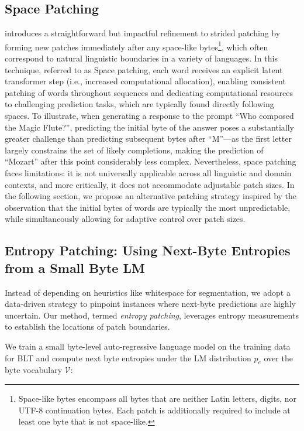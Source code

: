 \subsection{Space Patching}
\label{section:white-patch}

\citet{slagle2024spacebyte} introduces a straightforward but impactful refinement to strided patching by forming new patches immediately after any space-like bytes\footnote{
    Space-like bytes encompass all bytes that are neither Latin letters, digits, nor UTF-8 continuation bytes. Each patch is additionally required to include at least one byte that is not space-like. }, which often correspond to natural linguistic boundaries in a variety of languages. In this technique, referred to as Space patching, each word receives an explicit latent transformer step (i.e., increased computational allocation), enabling consistent patching of words throughout sequences and dedicating computational resources to challenging prediction tasks, which are typically found directly following spaces. To illustrate, when generating a response to the prompt ``Who composed the Magic Flute?\uline{\hspace{.6em}}'', predicting the initial byte of the answer poses a substantially greater challenge than predicting subsequent bytes after ``M''—as the first letter largely constrains the set of likely completions, making the prediction of ``Mozart'' after this point considerably less complex. Nevertheless, space patching faces limitations: it is not universally applicable across all linguistic and domain contexts, and more critically, it does not accommodate adjustable patch sizes. In the following section, we propose an alternative patching strategy inspired by the observation that the initial bytes of words are typically the most unpredictable, while simultaneously allowing for adaptive control over patch sizes.

\subsection{Entropy Patching: Using Next-Byte Entropies from a Small Byte LM}
\label{section:dyn-patch}

Instead of depending on heuristics like whitespace for segmentation, we adopt a data-driven strategy to pinpoint instances where next-byte predictions are highly uncertain. Our method, termed \textit{entropy patching}, leverages entropy measurements to establish the locations of patch boundaries.

We train a small byte-level auto-regressive language model on the training data for {\textsc BLT} and compute next byte entropies under the LM distribution $p_{e}$ over the byte vocabulary $\mathcal{V}$:

